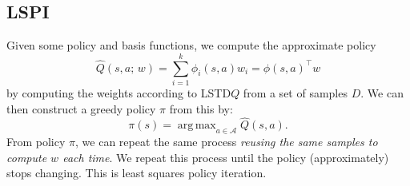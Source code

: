 \documentclass{article}
\DeclareMathOperator*{\argmax}{arg\,max}
\begin{document}
\subsection*{LSPI} %
\label{sub:lspi}

Given some policy and basis functions, we compute the approximate policy
\[
	\hat{Q}(s,a;\,w)=\sum_{i=1}^{k}\phi_{i}(s,a)w_{i}=\phi(s,a)^{\intercal}w
\]
by computing the weights according to LSTD$Q$ from a set of samples $D$. 
We can then construct a greedy policy $\pi$ from this by:
\[
	\pi(s)=\argmax_{a\in\mathcal{A}}\hat{Q}(s,a).
\]
From policy $\pi$, we can repeat the same process \emph{reusing the same samples to compute $w$ each time}.
We repeat this process until the policy (approximately) stops changing.
This is least squares policy iteration.

\end{document}
